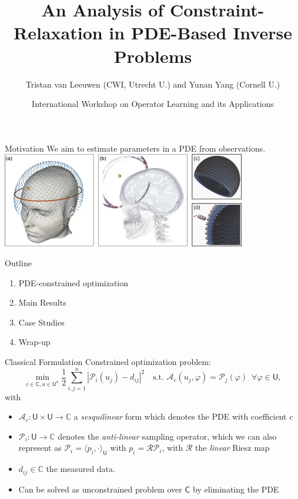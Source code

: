 \documentclass{beamer}
\title[Constraint-Relaxation in PDE Inverse Problems]{An Analysis of Constraint-Relaxation in PDE-Based Inverse Problems}
\author{Tristan van Leeuwen (CWI, Utrecht U.) and Yunan Yang (Cornell U.)}
\date{International Workshop on Operator Learning and its Applications}
\newcommand{\sU}{\mathsf{U}}
\newcommand{\sC}{\mathsf{C}}
\newcommand{\mA}{\mathcal{A}}
\newcommand{\mP}{\mathcal{P}}
\newcommand{\mR}{\mathcal{R}}
\begin{document}
\begin{frame}
  \titlepage
\end{frame}

\begin{frame}{Motivation}
We aim to estimate parameters in a PDE from observations.
\\[1cm]
\centering
\includegraphics[width=0.8\textwidth]{./figs/medical.png}

\cite{guasch2020full}

\end{frame}


\begin{frame}{Outline}
\begin{enumerate}
  \item PDE-constrained optimization
  \item Main Results
  \item Case Studies
  \item Wrap-up
\end{enumerate}
\end{frame}

\begin{frame}{Classical Formulation}
Constrained optimization problem:
\begin{equation*}
\min_{c\in\sC, u\in\sU^n} {\textstyle\frac{1}{2}} \sum_{i,j=1}^n |\mP_i(u_j) - d_{ij}|^2 \quad \text{s.t. } \mA_c(u_j, \varphi) = \mP_j(\varphi) \,\,\, \forall \varphi \in \sU,
\end{equation*}
with
\begin{itemize}
  \item $\mA_c: \sU\times \sU \rightarrow \mathbb{C}$ a \emph{sesquilinear} form which denotes the PDE with coefficient $c$
  \item $\mP_i : \sU \rightarrow \mathbb{C}$ denotes the \emph{anti-linear} sampling operator, which we can also represent as $\mP_i = \langle p_i,\cdot \rangle_\sU$ with $p_i = \mR \mP_i$, with $\mR$ the \emph{linear} Riesz map
  \item $d_{ij} \in \mathbb{C}$ the measured data. 
  \item Can be solved as unconstrained problem over $\sC$ by eliminating the PDE
\end{itemize}
\end{frame}
\end{document}
